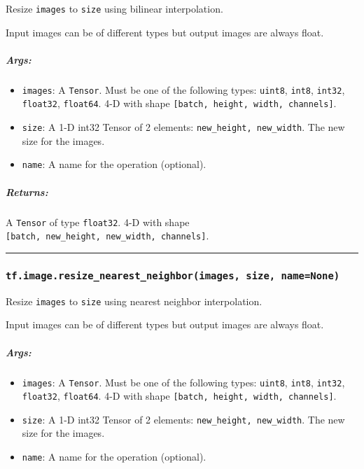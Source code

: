 Resize \texttt{images} to \texttt{size} using bilinear interpolation.

Input images can be of different types but output images are always
float.

\subparagraph{Args: }\label{args-7}

\begin{itemize}
\tightlist
\item
  \texttt{images}: A \texttt{Tensor}. Must be one of the following
  types: \texttt{uint8}, \texttt{int8}, \texttt{int32},
  \texttt{float32}, \texttt{float64}. 4-D with shape
  \texttt{{[}batch,\ height,\ width,\ channels{]}}.
\item
  \texttt{size}: A 1-D int32 Tensor of 2 elements:
  \texttt{new\_height,\ new\_width}. The new size for the images.
\item
  \texttt{name}: A name for the operation (optional).
\end{itemize}

\subparagraph{Returns: }\label{returns-7}

A \texttt{Tensor} of type \texttt{float32}. 4-D with shape
\texttt{{[}batch,\ new\_height,\ new\_width,\ channels{]}}.

\begin{center}\rule{0.5\linewidth}{\linethickness}\end{center}

\subsubsection{\texorpdfstring{\texttt{tf.image.resize\_nearest\_neighbor(images,\ size,\ name=None)}
}{tf.image.resize\_nearest\_neighbor(images, size, name=None) }}\label{tf.image.resizeux5fnearestux5fneighborimages-size-namenone}

Resize \texttt{images} to \texttt{size} using nearest neighbor
interpolation.

Input images can be of different types but output images are always
float.

\subparagraph{Args: }\label{args-8}

\begin{itemize}
\tightlist
\item
  \texttt{images}: A \texttt{Tensor}. Must be one of the following
  types: \texttt{uint8}, \texttt{int8}, \texttt{int32},
  \texttt{float32}, \texttt{float64}. 4-D with shape
  \texttt{{[}batch,\ height,\ width,\ channels{]}}.
\item
  \texttt{size}: A 1-D int32 Tensor of 2 elements:
  \texttt{new\_height,\ new\_width}. The new size for the images.
\item
  \texttt{name}: A name for the operation (optional).
\end{itemize}

